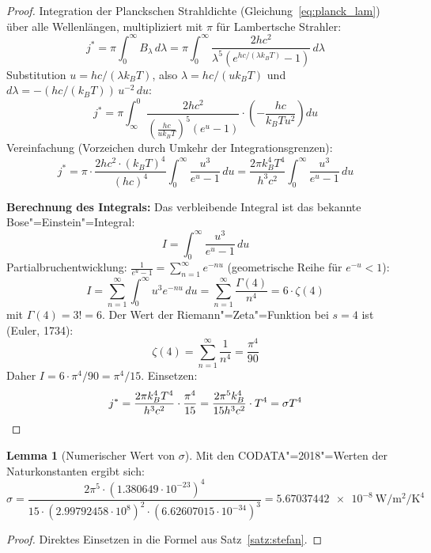 ﻿\documentclass[a4paper,12pt]{article}
\theoremstyle{definition}
\newtheorem{lemma}{Lemma}
\begin{document}
\begin{proof}
    Integration der Planckschen Strahldichte (Gleichung~\eqref{eq:planck_lam})
    über alle Wellenlängen, multipliziert mit $\pi$ für Lambertsche Strahler:
    \[
        j^* = \pi \int_0^\infty B_\lambda\,d\lambda
        = \pi \int_0^\infty \frac{2hc^2}{\lambda^5(e^{hc/(\lambda k_BT)}-1)}\,d\lambda
    \]
    Substitution $u = hc/(\lambda k_B T)$, also
    $\lambda = hc/(u k_B T)$ und $d\lambda = -(hc/(k_BT))\,u^{-2}\,du$:
    \[
        j^* = \pi \int_\infty^0
        \frac{2hc^2}{\left(\tfrac{hc}{uk_BT}\right)^5 (e^u - 1)}
        \cdot \left(-\frac{hc}{k_BT u^2}\right) du
    \]
    Vereinfachung (Vorzeichen durch Umkehr der Integrationsgrenzen):
    \[
        j^* = \pi \cdot \frac{2hc^2 \cdot (k_BT)^4}{(hc)^4}
        \int_0^\infty \frac{u^3}{e^u-1}\,du
        = \frac{2\pi k_B^4 T^4}{h^3 c^2} \int_0^\infty \frac{u^3}{e^u-1}\,du
    \]

    \textbf{Berechnung des Integrals:}
    Das verbleibende Integral ist das bekannte Bose"=Einstein"=Integral:
    \[
        I = \int_0^\infty \frac{u^3}{e^u-1}\,du
    \]
    Partialbruchentwicklung: $\frac{1}{e^u-1} = \sum_{n=1}^\infty e^{-nu}$
    (geometrische Reihe für $e^{-u} < 1$):
    \[
        I = \sum_{n=1}^\infty \int_0^\infty u^3 e^{-nu}\,du
        = \sum_{n=1}^\infty \frac{\Gamma(4)}{n^4}
        = 6 \cdot \zeta(4)
    \]
    mit $\Gamma(4) = 3! = 6$. Der Wert der Riemann"=Zeta"=Funktion bei $s=4$
    ist (Euler, 1734):
    \[
        \zeta(4) = \sum_{n=1}^\infty \frac{1}{n^4} = \frac{\pi^4}{90}
    \]
    Daher $I = 6 \cdot \pi^4/90 = \pi^4/15$. Einsetzen:
    \[
        j^* = \frac{2\pi k_B^4 T^4}{h^3 c^2} \cdot \frac{\pi^4}{15}
        = \frac{2\pi^5 k_B^4}{15 h^3 c^2} \cdot T^4 = \sigma T^4 \qedhere
    \]
\end{proof}

\begin{lemma}[Numerischer Wert von $\sigma$]
    Mit den CODATA"=2018"=Werten der Naturkonstanten ergibt sich:
    \[
        \sigma = \frac{2\pi^5 \cdot (1.380649\cdot10^{-23})^4}
                      {15 \cdot (2.99792458\cdot10^8)^2 \cdot (6.62607015\cdot10^{-34})^3}
        = \SI{5.67037442e-8}{\watt\per\metre\squared\per\kelvin\tothe{4}}
    \]
\end{lemma}

\begin{proof}
    Direktes Einsetzen in die Formel aus Satz~\ref{satz:stefan}. \qedhere
\end{proof}
\end{document}
